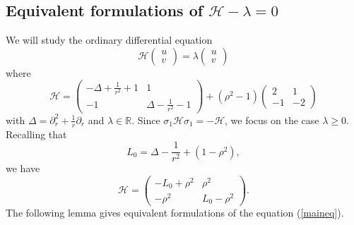 \documentclass[11 pt]{amsart}
\theoremstyle{definition}
\theoremstyle{remark}
\numberwithin{equation}{section}
\begin{document}
\subsection{Equivalent formulations of $\mathcal{H}-\lambda = 0$}
We will study the ordinary differential equation
\begin{equation}
  \mathcal{H} \left(\begin{array}{c}
    u\\
    v
  \end{array}\right) = \lambda \left(\begin{array}{c}
    u\\
    v
  \end{array}\right) \label{maineq}
\end{equation}
where
\[ \mathcal{H}= \left(\begin{array}{cc}
     - \Delta + \frac{1}{r^2} + 1 & 1\\
     - 1 & \Delta - \frac{1}{r^2} - 1
   \end{array}\right) + (\rho^2 - 1) \left(\begin{array}{cc}
     2 & 1\\
     - 1 & - 2
   \end{array}\right) \]
with $\Delta = \partial_r^2 + \frac{1}{r} \partial_r$ and $\lambda \in
\mathbb{R}$. Since $\sigma_1 \mathcal{H} \sigma_1 = -\mathcal{H}$, we focus on the case $\lambda \geqslant 0$. Recalling that
\[ L_0 = \Delta - \frac{1}{r^2} + (1 - \rho^2), \]
we have
\[ \mathcal{H}= \left(\begin{array}{cc}
     - L_0 + \rho^2 & \rho^2\\
     - \rho^2 & L_0 - \rho^2
   \end{array}\right) . \]
The following lemma gives equivalent formulations of the  equation (\ref{maineq}).
\end{document}

